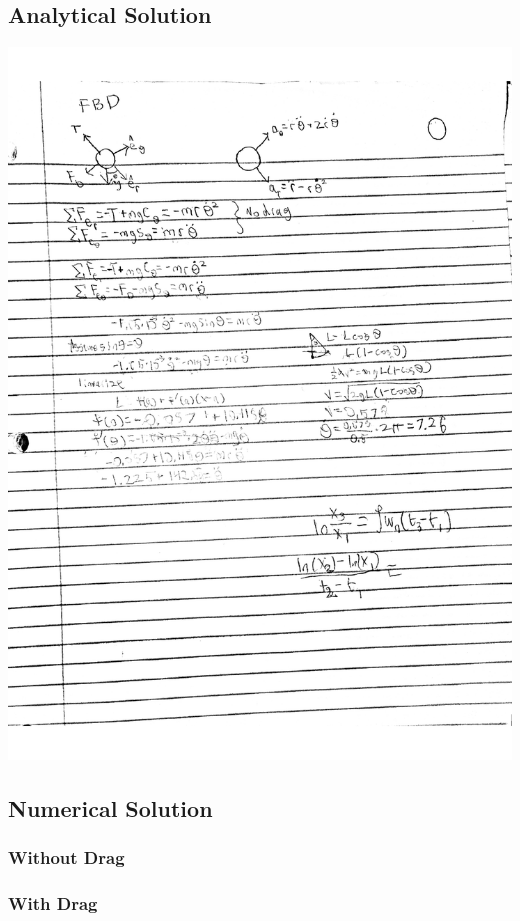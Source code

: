 \documentclass[12pt]{report}
\begin{document}
\begin{flushleft}
\subsection{Analytical Solution}
\includegraphics[frame, width=\textwidth]{analytical}
\newpage

\subsection{Numerical Solution} \label{appendix:numerical}
\subsubsection{Without Drag}

\newpage
\subsubsection{With Drag}


\end{flushleft}
\end{document}
